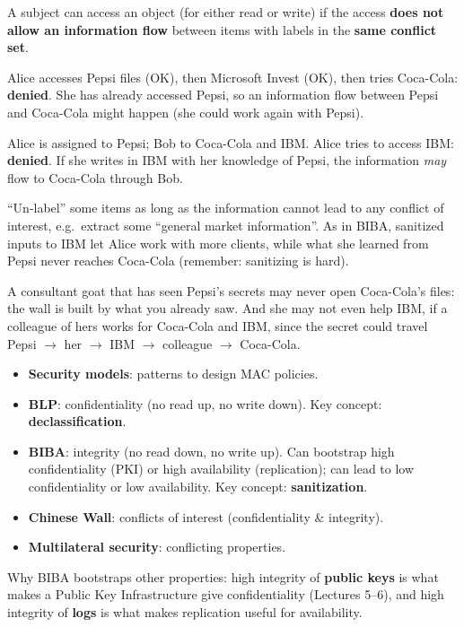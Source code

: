 \begin{defnbox}[title=Chinese Wall access rule]
A subject can access an object (for either read or write) if the access \textbf{does not
allow an information flow} between items with labels in the \textbf{same conflict set}.
\end{defnbox}

\begin{exbox}[title=Direct flow]
Alice accesses Pepsi files (OK), then Microsoft Invest (OK), then tries Coca-Cola:
\textbf{denied}. She has already accessed Pepsi, so an information flow between Pepsi and
Coca-Cola might happen (she could work again with Pepsi).
\end{exbox}

\begin{exbox}[title=Indirect flow]
Alice is assigned to Pepsi; Bob to Coca-Cola and IBM. Alice tries to access IBM:
\textbf{denied}. If she writes in IBM with her knowledge of Pepsi, the information
\emph{may} flow to Coca-Cola through Bob.
\end{exbox}

\begin{rembox}[title=Sanitization is necessary for business]
``Un-label'' some items as long as the information cannot lead to any conflict of
interest, e.g.\ extract some ``general market information''. As in BIBA, sanitized inputs to IBM
let Alice work with more clients, while what she learned from Pepsi never reaches Coca-Cola
(remember: sanitizing is hard).
\end{rembox}

\begin{goatbox}
A consultant goat that has seen Pepsi's secrets may never open Coca-Cola's files: the wall is
built by what you already saw. And she may not even help IBM, if a colleague of hers works for
Coca-Cola and IBM, since the secret could travel Pepsi $\to$ her $\to$ IBM $\to$ colleague $\to$
Coca-Cola.
\end{goatbox}

\begin{keybox}[title=Summary]
\begin{itemize}
  \item \textbf{Security models}: patterns to design MAC policies.
  \item \textbf{BLP}: confidentiality (no read up, no write down). Key concept:
        \textbf{declassification}.
  \item \textbf{BIBA}: integrity (no read down, no write up). Can bootstrap high
        confidentiality (PKI) or high availability (replication); can lead to low
        confidentiality or low availability. Key concept: \textbf{sanitization}.
  \item \textbf{Chinese Wall}: conflicts of interest (confidentiality \& integrity).
  \item \textbf{Multilateral security}: conflicting properties.
\end{itemize}
Why BIBA bootstraps other properties: high integrity of \textbf{public keys} is what makes a
Public Key Infrastructure give confidentiality (Lectures 5--6), and high integrity of
\textbf{logs} is what makes replication useful for availability.
\end{keybox}


